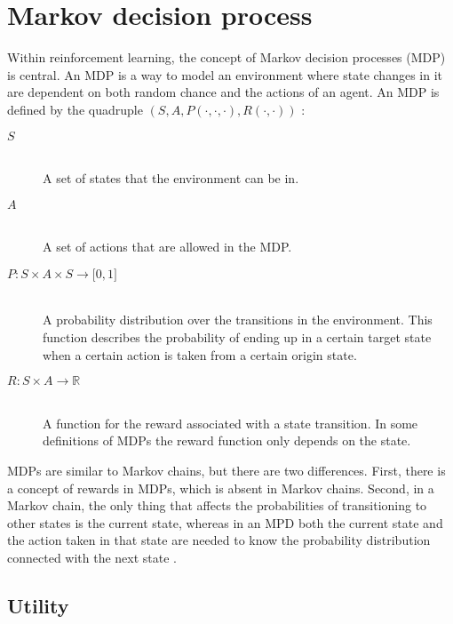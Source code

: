 \section{Markov decision process}
\label{sec:mdps}

Within reinforcement learning, the concept of Markov decision processes (MDP) is central. An MDP is a way to model an environment where state changes in it are dependent on both random chance and the actions of an agent. An MDP is defined by the quadruple $\left( S, A, P( \cdot , \cdot, \cdot ) , R( \cdot , \cdot ) \right)$ \parencite{altman2002applications}:

\begin{description}
\item[$S$] \hfill \\ 
    A set of states that the environment can be in.

\item[$A$] \hfill \\ 
    A set of actions that are allowed in the MDP.

\item[$P \colon S \times A \times S \to \mathbb \lbrack0, 1\rbrack$] \hfill \\ 
    A probability distribution over the transitions in the environment. This
    function describes the probability of ending up in a certain target state
    when a certain action is taken from a certain origin state. 

\item[$R \colon S \times A \to \mathbb{R}$] \hfill \\ 
    A function for the reward associated with a state transition. In some
    definitions of MDPs the reward function only depends on the state.

\end{description}

MDPs are similar to Markov chains, but there are two differences. First, there
is a concept of rewards in MDPs, which is absent in Markov chains. Second, in a
Markov chain, the only thing that affects the probabilities of transitioning to
other states is the current state, whereas in an MPD both the current state and
the action taken in that state are needed to know the probability distribution
connected with the next state \parencite{altman2002applications}.

\subsection{Utility}
\label{theBestLabelEvah}
\label{sec:utility}


